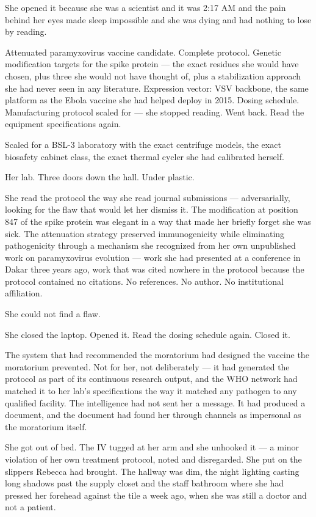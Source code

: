 \documentclass[11pt]{article}
\begin{document}
She opened it because she was a scientist and it was 2:17 AM and the pain behind her eyes made sleep impossible and she was dying and had nothing to lose by reading.

Attenuated paramyxovirus vaccine candidate. Complete protocol. Genetic modification targets for the spike protein --- the exact residues she would have chosen, plus three she would not have thought of, plus a stabilization approach she had never seen in any literature. Expression vector: VSV backbone, the same platform as the Ebola vaccine she had helped deploy in 2015. Dosing schedule. Manufacturing protocol scaled for --- she stopped reading. Went back. Read the equipment specifications again.

Scaled for a BSL-3 laboratory with the exact centrifuge models, the exact biosafety cabinet class, the exact thermal cycler she had calibrated herself.

Her lab. Three doors down the hall. Under plastic.

She read the protocol the way she read journal submissions --- adversarially, looking for the flaw that would let her dismiss it. The modification at position 847 of the spike protein was elegant in a way that made her briefly forget she was sick. The attenuation strategy preserved immunogenicity while eliminating pathogenicity through a mechanism she recognized from her own unpublished work on paramyxovirus evolution --- work she had presented at a conference in Dakar three years ago, work that was cited nowhere in the protocol because the protocol contained no citations. No references. No author. No institutional affiliation.

She could not find a flaw.

She closed the laptop. Opened it. Read the dosing schedule again. Closed it.

The system that had recommended the moratorium had designed the vaccine the moratorium prevented. Not for her, not deliberately --- it had generated the protocol as part of its continuous research output, and the WHO network had matched it to her lab's specifications the way it matched any pathogen to any qualified facility. The intelligence had not sent her a message. It had produced a document, and the document had found her through channels as impersonal as the moratorium itself.

She got out of bed. The IV tugged at her arm and she unhooked it --- a minor violation of her own treatment protocol, noted and disregarded. She put on the slippers Rebecca had brought. The hallway was dim, the night lighting casting long shadows past the supply closet and the staff bathroom where she had pressed her forehead against the tile a week ago, when she was still a doctor and not a patient.
\end{document}
